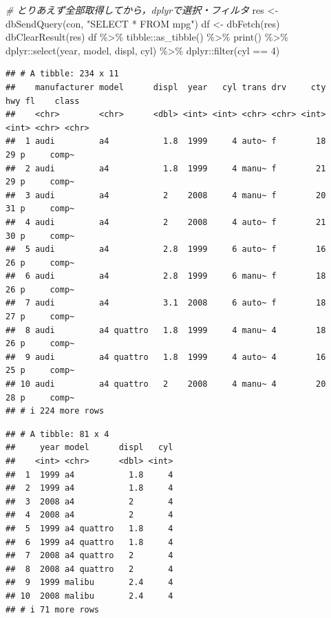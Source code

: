 \documentclass[
]{article}
\newenvironment{Shaded}{\begin{snugshade}}{\end{snugshade}}
\newcommand{\CommentTok}[1]{\textcolor[rgb]{0.56,0.35,0.01}{\textit{#1}}}
\newcommand{\DecValTok}[1]{\textcolor[rgb]{0.00,0.00,0.81}{#1}}
\newcommand{\FunctionTok}[1]{\textcolor[rgb]{0.00,0.00,0.00}{#1}}
\newcommand{\NormalTok}[1]{#1}
\newcommand{\OtherTok}[1]{\textcolor[rgb]{0.56,0.35,0.01}{#1}}
\newcommand{\SpecialCharTok}[1]{\textcolor[rgb]{0.00,0.00,0.00}{#1}}
\newcommand{\StringTok}[1]{\textcolor[rgb]{0.31,0.60,0.02}{#1}}
\begin{document}
\begin{Shaded}
\begin{Highlighting}[]
  \CommentTok{\# とりあえず全部取得してから，dplyrで選択・フィルタ}
\NormalTok{res }\OtherTok{\textless{}{-}} \FunctionTok{dbSendQuery}\NormalTok{(con, }\StringTok{"SELECT * FROM mpg"}\NormalTok{)}
\NormalTok{df }\OtherTok{\textless{}{-}} \FunctionTok{dbFetch}\NormalTok{(res)}
\FunctionTok{dbClearResult}\NormalTok{(res)}
\NormalTok{df }\SpecialCharTok{\%\textgreater{}\%}
\NormalTok{  tibble}\SpecialCharTok{::}\FunctionTok{as\_tibble}\NormalTok{() }\SpecialCharTok{\%\textgreater{}\%}
  \FunctionTok{print}\NormalTok{() }\SpecialCharTok{\%\textgreater{}\%}
\NormalTok{  dplyr}\SpecialCharTok{::}\FunctionTok{select}\NormalTok{(year, model, displ, cyl) }\SpecialCharTok{\%\textgreater{}\%}
\NormalTok{  dplyr}\SpecialCharTok{::}\FunctionTok{filter}\NormalTok{(cyl }\SpecialCharTok{==} \DecValTok{4}\NormalTok{)}
\end{Highlighting}
\end{Shaded}

\begin{verbatim}
## # A tibble: 234 x 11
##    manufacturer model      displ  year   cyl trans drv     cty   hwy fl    class
##    <chr>        <chr>      <dbl> <int> <int> <chr> <chr> <int> <int> <chr> <chr>
##  1 audi         a4           1.8  1999     4 auto~ f        18    29 p     comp~
##  2 audi         a4           1.8  1999     4 manu~ f        21    29 p     comp~
##  3 audi         a4           2    2008     4 manu~ f        20    31 p     comp~
##  4 audi         a4           2    2008     4 auto~ f        21    30 p     comp~
##  5 audi         a4           2.8  1999     6 auto~ f        16    26 p     comp~
##  6 audi         a4           2.8  1999     6 manu~ f        18    26 p     comp~
##  7 audi         a4           3.1  2008     6 auto~ f        18    27 p     comp~
##  8 audi         a4 quattro   1.8  1999     4 manu~ 4        18    26 p     comp~
##  9 audi         a4 quattro   1.8  1999     4 auto~ 4        16    25 p     comp~
## 10 audi         a4 quattro   2    2008     4 manu~ 4        20    28 p     comp~
## # i 224 more rows
\end{verbatim}

\begin{verbatim}
## # A tibble: 81 x 4
##     year model      displ   cyl
##    <int> <chr>      <dbl> <int>
##  1  1999 a4           1.8     4
##  2  1999 a4           1.8     4
##  3  2008 a4           2       4
##  4  2008 a4           2       4
##  5  1999 a4 quattro   1.8     4
##  6  1999 a4 quattro   1.8     4
##  7  2008 a4 quattro   2       4
##  8  2008 a4 quattro   2       4
##  9  1999 malibu       2.4     4
## 10  2008 malibu       2.4     4
## # i 71 more rows
\end{verbatim}
\end{document}
